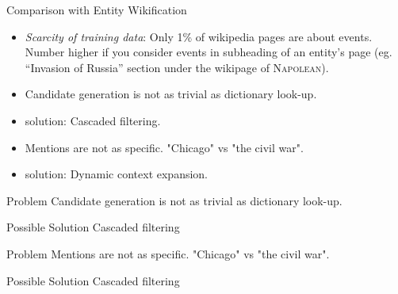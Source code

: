 
\begin{frame}{Comparison with Entity Wikification}

\begin{itemize}
\item \emph{Scarcity of training data}: Only 1\% of wikipedia pages are about events. Number higher if you consider events in subheading of an entity's page (eg. ``Invasion of Russia'' section under the wikipage of \textsc{Napolean}).
\pause
\item Candidate generation is not as trivial as dictionary look-up.
\pause
\item {\color{red}solution:} Cascaded filtering.
\pause
\item Mentions are not as specific. "Chicago" vs "the civil war".
\pause
\item {\color{red}solution:} Dynamic context expansion.
\end{itemize}
\end{frame}

\begin{frame}

\begin{block}{Problem}
Candidate generation is not as trivial as dictionary look-up.
\end{block}

\begin{exampleblock}{Possible Solution}
Cascaded filtering
\end{exampleblock}

\begin{block}{Problem}
Mentions are not as specific. "Chicago" vs "the civil war".
\end{block}

\begin{exampleblock}{Possible Solution}
Cascaded filtering
\end{exampleblock}
\end{frame}
